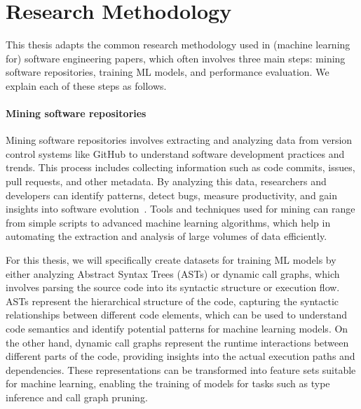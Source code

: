 \section{Research Methodology}
This thesis adapts the common research methodology used in (machine learning for) software engineering papers, which often involves three main steps: mining software repositories, training ML models, and performance evaluation. We explain each of these steps as follows.

\paragraph{Mining software repositories} Mining software repositories involves extracting and analyzing data from version control systems like GitHub to understand software development practices and trends. This process includes collecting information such as code commits, issues, pull requests, and other metadata. By analyzing this data, researchers and developers can identify patterns, detect bugs, measure productivity, and gain insights into software evolution~\cite{kalliamvakou2016depth}. Tools and techniques used for mining can range from simple scripts to advanced machine learning algorithms, which help in automating the extraction and analysis of large volumes of data efficiently.

For this thesis, we will specifically create datasets for training ML models by either analyzing Abstract Syntax Trees (ASTs) or dynamic call graphs, which involves parsing the source code into its syntactic structure or execution flow. ASTs represent the hierarchical structure of the code, capturing the syntactic relationships between different code elements, which can be used to understand code semantics and identify potential patterns for machine learning models. On the other hand, dynamic call graphs represent the runtime interactions between different parts of the code, providing insights into the actual execution paths and dependencies. These representations can be transformed into feature sets suitable for machine learning, enabling the training of models for tasks such as type inference and call graph pruning.

